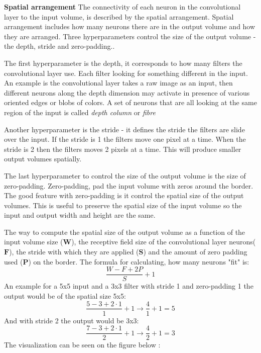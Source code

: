 \textbf{Spatial arrangement}
The connectivity of each neuron in the convolutional layer to the input volume, is described by the spatial arrangement. Spatial arrangement includes how many neurons there are in the output volume and how they are arranged. Three hyperparameters control the size of the output volume - the depth, stride and zero-padding.. 

The first hyperparameter is the depth, it corresponds to how many filters the convolutional layer use. Each filter looking for something different in the input. An example is the convolutional layer takes a raw image as an input, then different neurons along the depth dimension may activate in presence of various oriented edges or blobs of colors. A set of neurons that are all looking at the same region of the input is called \textit{depth column} or \textit{fibre}

Another hyperparameter is the stride - it defines the stride the filters are slide over the input. If the stride is 1 the filters move one pixel at a time. When the stride is 2 then the filters moves 2 pixels at a time. This will produce smaller output volumes spatially.

The last hyperparameter to control the size of the output volume is the size of zero-padding. Zero-padding, pad the input volume with zeros around the border. The good feature with zero-padding is it control the spatial size of the output volumes. This is useful to preserve the spatial size of the input volume so the input and output width and height are the same. 

The way to compute the spatial size of the output volume as a function of the input volume size ($\textbf{W}$), the receptive field size of the convolutional layer neurons($\textbf{F}$), the stride with which they are applied ($\textbf{S}$) and the amount of zero padding used ($\textbf{P}$) on the border. The formula for calculating, how many neurons "fit" is:
\begin{equation}
\frac{W-F+2P}{S}+1
\end{equation}    
An example for a 5x5 input and a 3x3 filter with stride 1 and zero-padding 1 the output would be of the spatial size 5x5:
\begin{equation}
\frac{5-3+2\cdot1 }{1}+1         \rightarrow             \frac{4}{1}+1 =5
\end{equation} 
And with stride 2 the output would be 3x3:
\begin{equation}
\frac{7-3+2\cdot1 }{2}+1         \rightarrow             \frac{4}{2}+1 =3
\end{equation} 
The visualization can be seen on the figure below : 

